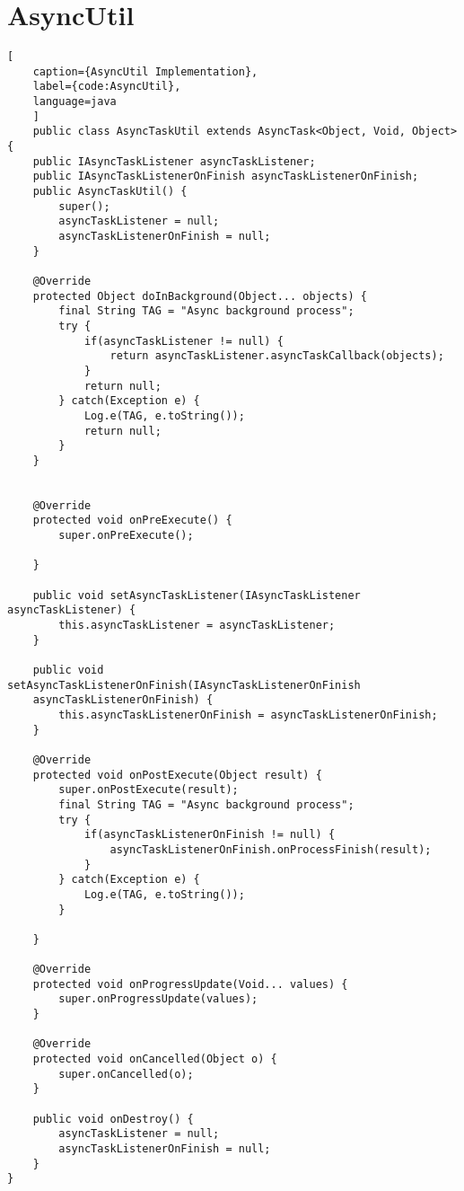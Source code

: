 \newpage
\section{AsyncUtil}

\begin{lstlisting}[
    caption={AsyncUtil Implementation},
    label={code:AsyncUtil},
    language=java
    ]
    public class AsyncTaskUtil extends AsyncTask<Object, Void, Object> {
    public IAsyncTaskListener asyncTaskListener;
    public IAsyncTaskListenerOnFinish asyncTaskListenerOnFinish;
    public AsyncTaskUtil() {
        super();
        asyncTaskListener = null;
        asyncTaskListenerOnFinish = null;
    }

    @Override
    protected Object doInBackground(Object... objects) {
        final String TAG = "Async background process";
        try {
            if(asyncTaskListener != null) {
                return asyncTaskListener.asyncTaskCallback(objects);
            }
            return null;
        } catch(Exception e) {
            Log.e(TAG, e.toString());
            return null;
        }
    }


    @Override
    protected void onPreExecute() {
        super.onPreExecute();

    }

    public void setAsyncTaskListener(IAsyncTaskListener asyncTaskListener) {
        this.asyncTaskListener = asyncTaskListener;
    }

    public void setAsyncTaskListenerOnFinish(IAsyncTaskListenerOnFinish 
    asyncTaskListenerOnFinish) {
        this.asyncTaskListenerOnFinish = asyncTaskListenerOnFinish;
    }

    @Override
    protected void onPostExecute(Object result) {
        super.onPostExecute(result);
        final String TAG = "Async background process";
        try {
            if(asyncTaskListenerOnFinish != null) {
                asyncTaskListenerOnFinish.onProcessFinish(result);
            }
        } catch(Exception e) {
            Log.e(TAG, e.toString());
        }

    }

    @Override
    protected void onProgressUpdate(Void... values) {
        super.onProgressUpdate(values);
    }

    @Override
    protected void onCancelled(Object o) {
        super.onCancelled(o);
    }

    public void onDestroy() {
        asyncTaskListener = null;
        asyncTaskListenerOnFinish = null;
    }
}
\end{lstlisting}    